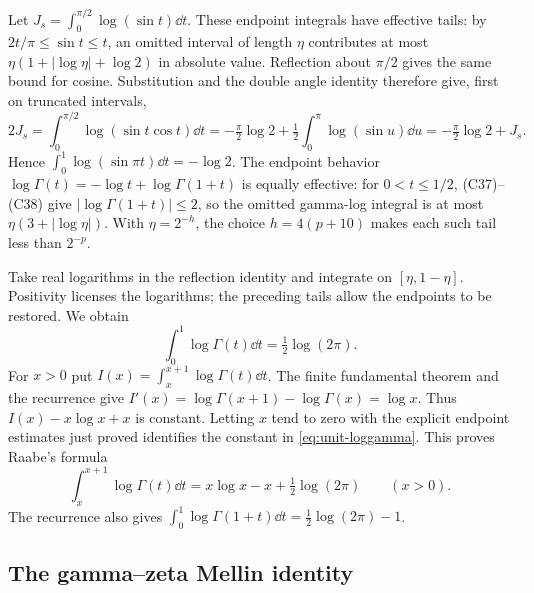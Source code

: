 Let $J_s=\int_0^{\pi/2}\log(\sin t)\dd t$. These endpoint integrals
have effective tails: by $2t/\pi\le\sin t\le t$, an omitted interval
of length $\eta$ contributes at most
$\eta(1+|\log\eta|+\log2)$ in absolute value. Reflection about
$\pi/2$ gives the same bound for cosine. Substitution and the double
angle identity therefore give, first on truncated intervals,
\[
 2J_s=\int_0^{\pi/2}\log(\sin t\cos t)\dd t
     =-\tfrac\pi2\log2+\tfrac12\int_0^\pi\log(\sin u)\dd u
     =-\tfrac\pi2\log2+J_s.
\]
Hence $\int_0^1\log(\sin\pi t)\dd t=-\log2$.
The endpoint behavior
$\log\Gamma(t)=-\log t+\log\Gamma(1+t)$ is equally effective:
for $0<t\le1/2$, (C37)--(C38) give
$|\log\Gamma(1+t)|\le2$, so the omitted gamma-log integral is at
most $\eta(3+|\log\eta|)$. With $\eta=2^{-h}$, the choice
$h=4(p+10)$ makes each such tail less than $2^{-p}$.

Take real logarithms in the reflection identity and integrate on
$[\eta,1-\eta]$. Positivity licenses the logarithms; the preceding
tails allow the endpoints to be restored. We obtain
\begin{equation}
 \boxed{\displaystyle
 \int_0^1\log\Gamma(t)\dd t=\tfrac12\log(2\pi).}
 \label{eq:unit-loggamma}
\end{equation}
For $x>0$ put $I(x)=\int_x^{x+1}\log\Gamma(t)\dd t$.
The finite fundamental theorem and the recurrence give
$I'(x)=\log\Gamma(x+1)-\log\Gamma(x)=\log x$.
Thus $I(x)-x\log x+x$ is constant. Letting $x$ tend to zero with the
explicit endpoint estimates just proved identifies the constant in
\eqref{eq:unit-loggamma}. This proves Raabe's formula
\begin{equation}
 \boxed{\displaystyle
 \int_x^{x+1}\log\Gamma(t)\dd t
 =x\log x-x+\tfrac12\log(2\pi)\qquad(x>0).}
 \label{eq:raabe}
\end{equation}
The recurrence also gives
$\int_0^1\log\Gamma(1+t)\dd t=\tfrac12\log(2\pi)-1$.

\subsection{The gamma--zeta Mellin identity}

